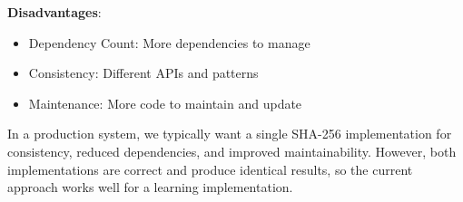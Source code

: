 \needspace{2in}
\noindent
\textbf{Disadvantages}:
\begin{itemize}
  \item Dependency Count: More dependencies to manage
  \item Consistency: Different APIs and patterns
  \item Maintenance: More code to maintain and update
\end{itemize}

In a production system, we typically want a single SHA-256 implementation for consistency, reduced dependencies, and improved maintainability. However, both implementations are correct and produce identical results, so the current approach works well for a learning implementation.

